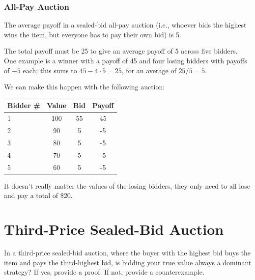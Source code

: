 \documentclass[newpages, arabicsubsec]{assignment}
\begin{document}
\subsubsection{All-Pay Auction}
\begin{problem}
The average payoff in a sealed-bid all-pay auction (i.e., whoever bids the highest wins the item, but everyone has to pay their own bid) is 5.
\end{problem}
\begin{solution}
    The total payoff must be 25 to give an average payoff of 5 across five bidders. One example is a winner with a payoff of 45 and four losing bidders with payoffs of \(-5\) each; this sums to \(45-4\cdot5=25\), for an average of \(25/5=5\).

    We can make this happen with the following auction:

    \begin{table}[h]
        \centering
        \begin{tabular}{lccc}
            \toprule
            Bidder \# & Value & Bid & Payoff \\
            \midrule
            1         & 100   & 55  & 45     \\
            2         & 90    & 5   & -5     \\
            3         & 80    & 5   & -5     \\
            4         & 70    & 5   & -5     \\
            5         & 60    & 5   & -5     \\
            \bottomrule
        \end{tabular}
    \end{table}

    It doesn't really matter the values of the losing bidders, they only need to all lose and pay a total of \$20.
\end{solution}

\section{Third-Price Sealed-Bid Auction}

\begin{problem}
In a third-price sealed-bid auction, where the buyer with the highest bid buys the item and pays the third-highest bid, is bidding your true value always a dominant strategy? If yes, provide a proof. If not, provide a counterexample.
\end{problem}
\end{document}
